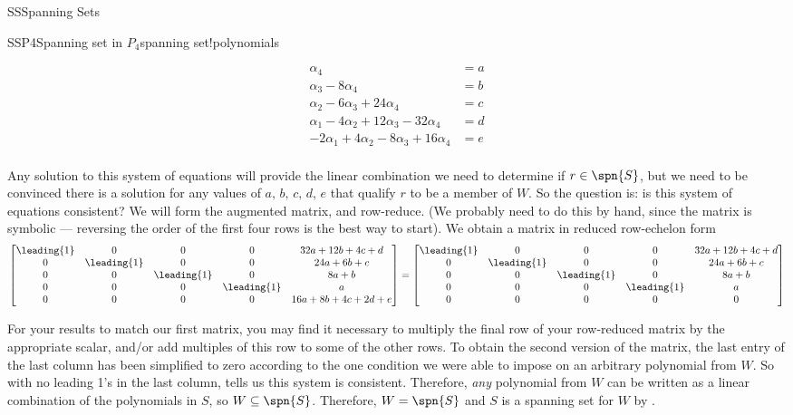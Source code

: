 \begin{subsect}{SS}{Spanning Sets}
\begin{example}{SSP4}{Spanning set in $P_4$}{spanning set!polynomials}
\begin{para}
%
\begin{align*}
\alpha_4&=a\\
\alpha_3-8\alpha_4&=b\\
\alpha_2-6\alpha_3+24\alpha_4&=c\\
\alpha_1-4\alpha_2+12\alpha_3-32\alpha_4&=d\\
-2\alpha_1+4\alpha_2-8\alpha_3+16\alpha_4&=e\\
\end{align*}
\end{para}
%
\begin{para}Any solution to this system of equations will provide the linear combination we need to determine if $r\in\spn{S}$, but we need to be convinced there is a solution for any values of $a,\,b,\,c,\,d,\,e$ that qualify $r$ to be a member of $W$.  So the question is:  is this system of equations consistent?  We will form the augmented matrix, and row-reduce. (We probably need to do this by hand, since the matrix is symbolic --- reversing the order of the first four rows is the best way to start).  We obtain a matrix in reduced row-echelon form
%
\begin{equation*}
\begin{bmatrix}
\leading{1}&0&0&0&32a+12b+4c+d\\
0&\leading{1}&0&0&24a+6b+c\\
0&0&\leading{1}&0&8a+b\\
0&0&0&\leading{1}&a\\
0&0&0&0&16a+8b+4c+2d+e
\end{bmatrix}
=
\begin{bmatrix}
\leading{1}&0&0&0&32a+12b+4c+d\\
0&\leading{1}&0&0&24a+6b+c\\
0&0&\leading{1}&0&8a+b\\
0&0&0&\leading{1}&a\\
0&0&0&0&0
\end{bmatrix}
\end{equation*}
\end{para}
%
\begin{para}For your results to match our first matrix, you may find it necessary to multiply the final row of your row-reduced matrix by the appropriate scalar, and/or add multiples of this row to some of the other rows.  To obtain the second version of the matrix, the last entry of the last column has been simplified to zero according to the one condition we were able to impose on an arbitrary polynomial from $W$.    So with no leading 1's in the last column,  tells us this system is consistent.  Therefore, {\em any} polynomial from $W$ can be written as a linear combination of the polynomials in $S$, so $W\subseteq\spn{S}$. Therefore,  $W=\spn{S}$ and $S$ is a spanning set for $W$ by .\end{para}

\end{example}
\end{subsect}
